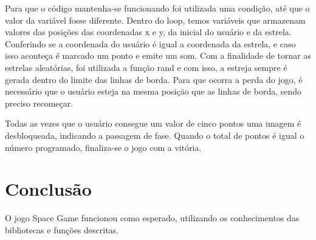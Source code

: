 \documentclass[journal]{IEEEtran}
\begin{document}
Para que o código mantenha-se funcionando foi utilizada uma condição, até que o valor da variável fosse diferente. Dentro do loop, temos variáveis que armazenam valores das posições das coordenadas x e y, da inicial do usuário e da estrela. Conferindo  se a coordenada do usuário é igual a coordenada da estrela, e caso isso aconteça é marcado um ponto e emite um som. Com a finalidade de tornar as estrelas aleatórias, foi utilizada a função rand e com isso, a estreja sempre é gerada dentro do limite das linhas de borda. Para que ocorra a perda do jogo, é necessário que o usuário esteja na mesma posição que as linhas de borda, sendo preciso recomeçar.

Todas as vezes que o usuário consegue um valor de cinco pontos uma imagem é desbloqueada, indicando a passagem de fase. Quando o total de pontos é igual o número programado, finaliza-se o jogo com a vitória.

\section{Conclusão}

O jogo Space Game funcionou como esperado, utilizando os conhecimentos das bibliotecas e funções descritas. 
\end{document}
